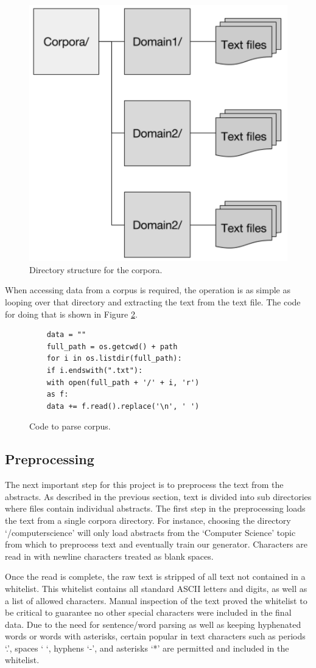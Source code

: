 \documentclass[letterpaper, 10 pt, conference]{ieeeconf}  %
\begin{document}
\begin{figure}[!ht]
	\centering
	\includegraphics[width=.4\textwidth]{filestruct}
	\caption{Directory structure for the corpora.}
	\label{fig:Directorystructure}
\end{figure}

When accessing data from a corpus is required, the operation is as simple as looping over that directory and extracting the text from the text file. The code for doing that is shown in Figure  \ref{fig:Codeparse}. 

\begin{figure}[!ht]
	\begin{verbatim}
	data = ""
	full_path = os.getcwd() + path
	for i in os.listdir(full_path):
	if i.endswith(".txt"):
	with open(full_path + '/' + i, 'r') 
	as f:
	data += f.read().replace('\n', ' ')
	\end{verbatim}
	
	\caption{Code to parse corpus.}
	\label{fig:Codeparse}
\end{figure}

\subsection{Preprocessing}

The next important step for this project is to preprocess the text from the abstracts. As described in the previous section, text is divided into sub directories where files contain individual abstracts. The first step in the preprocessing loads the text from a single corpora directory. For instance, choosing the directory ‘/computerscience’ will only load abstracts from the ‘Computer Science’ topic from which to preprocess text and eventually train our generator. Characters are read in with newline characters treated as blank spaces. 

Once the read is complete, the raw text is stripped of all text not contained in a whitelist. This whitelist contains all standard ASCII letters and digits, as well as a list of allowed characters. Manual inspection of the text proved the whitelist to be critical to guarantee no other special characters were included in the final data. Due to the need for sentence/word parsing as well as keeping hyphenated words or words with asterisks, certain popular in text characters such as periods ‘.’, spaces ‘ ‘, hyphens ‘-’, and asterisks ‘*’ are permitted and included in the whitelist. 
\end{document}
